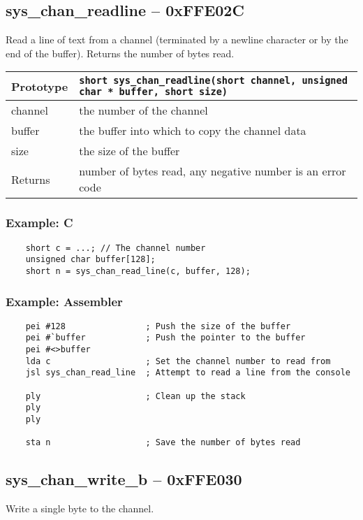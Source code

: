 \subsection*{sys\_chan\_readline -- 0xFFE02C}
Read a line of text from a channel (terminated by a newline character or by the end of the buffer). Returns the number of bytes read.

\bigskip

\begin{tabular}{|l||l|} \hline
Prototype & \lstinline!short sys_chan_readline(short channel, unsigned char * buffer, short size)! \\ \hline
channel & the number of the channel \\ \hline
buffer & the buffer into which to copy the channel data \\ \hline
size & the size of the buffer \\ \hline
Returns & number of bytes read, any negative number is an error code \\ \hline
\end{tabular}

\subsubsection*{Example: C}
\begin{lstlisting}
    short c = ...; // The channel number
    unsigned char buffer[128];
    short n = sys_chan_read_line(c, buffer, 128);    
\end{lstlisting}

\subsubsection*{Example: Assembler}
\begin{verbatim}
    pei #128                ; Push the size of the buffer
    pei #`buffer            ; Push the pointer to the buffer
    pei #<>buffer
    lda c                   ; Set the channel number to read from
    jsl sys_chan_read_line  ; Attempt to read a line from the console

    ply                     ; Clean up the stack
    ply
    ply

    sta n                   ; Save the number of bytes read
\end{verbatim}

\subsection*{sys\_chan\_write\_b -- 0xFFE030}
Write a single byte to the channel.

